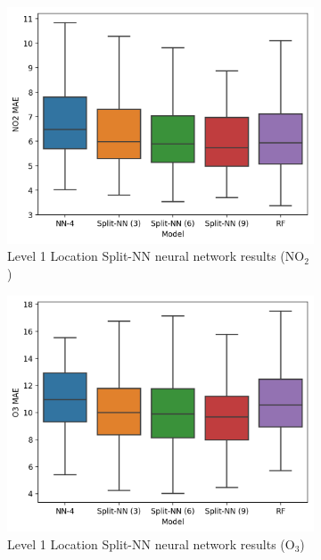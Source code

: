 \documentclass[journal abbreviation, manuscript]{copernicus}
\newcommand{\textus}[1]{$_{\text{#1}}$}
\begin{document}
\begin{figure}[H]
\centering
\begin{subfigure}{0.45\textwidth}
\includegraphics[width=\textwidth]{results/split-no2-location-mae}
\caption{Level 1 Location Split-NN neural network results (NO\textus{2})}
\end{subfigure}
\begin{subfigure}{0.45\textwidth}
\includegraphics[width=\textwidth]{results/split-o3-location-mae}
\caption{Level 1 Location Split-NN neural network results (O\textus{3})}
\end{subfigure}
\begin{subfigure}{0.45\textwidth}

\end{subfigure}
\end{figure}
\end{document}
